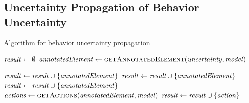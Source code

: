 \subsection{Uncertainty Propagation of Behavior Uncertainty}

\begin{algorithm}
    \caption{Algorithm for behavior uncertainty propagation}
    \label{alg:impactanalysis:behavior}
    \begin{algorithmic}[1]
        \algindentskip
        \State $\mathit{result} \gets \emptyset$
        \State $\mathit{annotatedElement} \gets \textsc{getAnnotatedElement}(\mathit{uncertainty}, \mathit{model})$
        \algblockskip

         \label{alg:impactanalysis:behavior:4}
                \State $\mathit{result} \gets \mathit{result} \cup \{ \mathit{annotatedElement} \}$
            \EndCase
                \State $\mathit{result} \gets \mathit{result} \cup \{ \mathit{annotatedElement} \}$
            \EndCase
                \State $\mathit{result} \gets \mathit{result} \cup \{ \mathit{annotatedElement} \}$
            \EndCase
             \label{alg:impactanalysis:behavior:11}
                \State $\mathit{actions} \gets \textsc{getActions}(\mathit{annotatedElement}, \mathit{model})$
                        \State $\mathit{result} \gets \mathit{result} \cup \{ \mathit{action} \}$
                    \EndIf
                \EndFor
            \EndCase
        \EndSwitch
        \algblockskip

        \State {}
        \algindentskip
        \EndProcedure   
    \end{algorithmic}
\end{algorithm}

